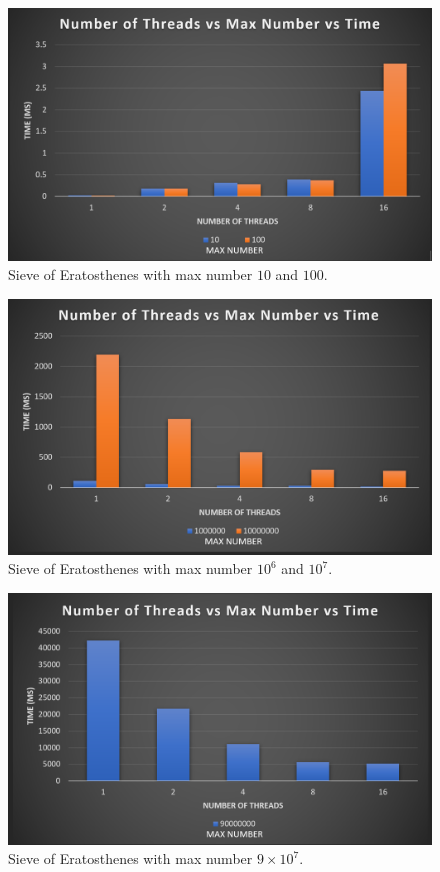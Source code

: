 \begin{figure}
  \centering
  \includegraphics[width=\linewidth]{Figures/results_small.png}
  \caption{Sieve of Eratosthenes with max number $10$ and $100$.}
  \label{fig:sieve10100}
\end{figure}

\begin{figure}
  \centering
  \includegraphics[width=\linewidth]{Figures/results_med.png}
  \caption{Sieve of Eratosthenes with max number $10^6$ and $10^7$.}
  \label{fig:sieve100000010000000}
\end{figure}

\begin{figure}
  \centering
  \includegraphics[width=\linewidth]{Figures/results_large.png}
  \caption{Sieve of Eratosthenes with max number $9\times10^7$.}
  \label{fig:sieve90000000}
\end{figure}


